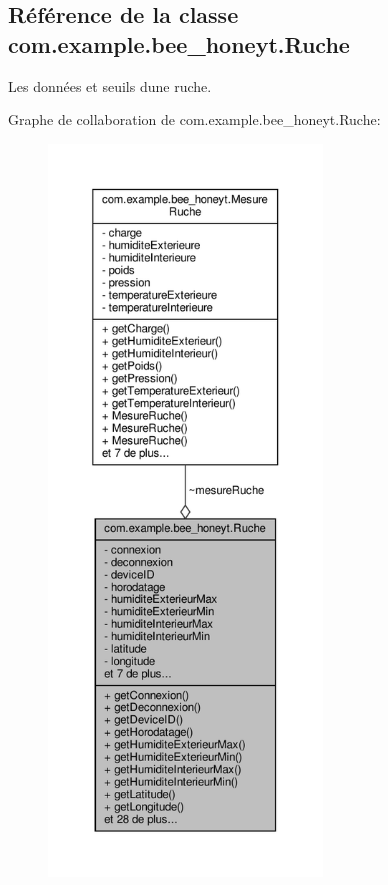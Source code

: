 \hypertarget{classcom_1_1example_1_1bee__honeyt_1_1_ruche}{}\subsection{Référence de la classe com.\+example.\+bee\+\_\+honeyt.\+Ruche}
\label{classcom_1_1example_1_1bee__honeyt_1_1_ruche}


Les données et seuils d\textquotesingle{}une ruche.  




Graphe de collaboration de com.\+example.\+bee\+\_\+honeyt.\+Ruche\+:
\nopagebreak
\begin{figure}[H]
\begin{center}
\leavevmode
\includegraphics[height=550pt]{classcom_1_1example_1_1bee__honeyt_1_1_ruche__coll__graph}
\end{center}
\end{figure}
